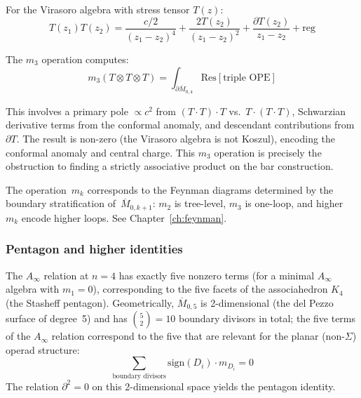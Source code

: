 \begin{example}
For the Virasoro algebra with stress tensor $T(z)$:
\[T(z_1)T(z_2) = \frac{c/2}{(z_1-z_2)^4} + \frac{2T(z_2)}{(z_1-z_2)^2} + 
\frac{\partial T(z_2)}{z_1-z_2} + \text{reg}\]

The $m_3$ operation computes:
\[m_3(T \otimes T \otimes T) = 
\int_{\partial \overline{M}_{0,4}} \text{Res}[\text{triple OPE}]\]

This involves a primary pole $\propto c^2$ from $(T \cdot T) \cdot T$ vs.\ $T \cdot (T \cdot T)$, Schwarzian derivative terms from the conformal anomaly, and descendant contributions from $\partial T$.  The result is non-zero (the Virasoro algebra is not Koszul), encoding the conformal anomaly 
and central charge. This $m_3$ operation is precisely the obstruction to finding 
a strictly associative product on the bar construction.
\end{example}

\begin{remark}
\label{rem:ainfty-feynman-preview}
The operation~$m_k$ corresponds to the Feynman diagrams
determined by the boundary stratification
of~$\overline{M}_{0,k+1}$: $m_2$ is tree-level, $m_3$ is
one-loop, and higher~$m_k$ encode higher loops.
See Chapter~\ref{ch:feynman}.
\end{remark}

\subsubsection{Pentagon and higher identities}

\begin{theorem}\label{thm:pentagon-identity}
The $A_\infty$ relation at $n = 4$ has exactly five nonzero terms (for a minimal
$A_\infty$ algebra with $m_1 = 0$), corresponding to the five facets of the
associahedron $K_4$ (the Stasheff pentagon).  Geometrically, $\overline{M}_{0,5}$ is 2-dimensional (the del Pezzo
surface of degree~5) and has $\binom{5}{2} = 10$ boundary divisors in total; the five terms of the $A_\infty$ relation correspond to the five that are relevant for the planar (non-$\Sigma$) operad structure:
\[\sum_{\text{boundary divisors}} \text{sign}(D_i) \cdot m_{D_i} = 0\]
The relation $\partial^2 = 0$ on this 2-dimensional space yields the pentagon identity.
\end{theorem}

